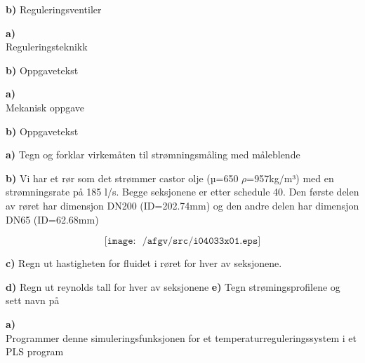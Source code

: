 \textbf{b)}
Reguleringsventiler
\vskip 1cm 

\vfil \eject
\oppgave{}%
\textbf{a)}\\
Reguleringsteknikk
\vskip 1cm 


\textbf{b)}
Oppgavetekst
\vskip 1cm 
\vfil \eject
\oppgave{}%
\textbf{a)}\\
Mekanisk oppgave
\vskip 1cm 


\textbf{b)}
Oppgavetekst
\vskip 1cm 


\vfil \eject
\oppgave{}%
\textbf{a)}
Tegn og forklar virkemåten til strømningsmåling med måleblende
\vskip 1cm

\textbf{b)}
Vi har et rør som det strømmer castor olje (µ=650 $\rho$=957kg/m³) med en strømningsrate på 185 l/s. Begge seksjonene er etter schedule 40.  Den første delen av røret har dimensjon DN200 (ID=202.74mm) og den andre delen har dimensjon DN65 (ID=62.68mm)

$$\texttt{[image: ~/afgv/src/i04033x01.eps]}$$

\textbf{c)}
Regn ut hastigheten for fluidet i røret for hver av seksjonene. 

\vskip 1cm 

\textbf{d)}
Regn ut reynolds tall for hver av seksjonene
\vskip 1cm 
\textbf{e)}
Tegn strømingsprofilene og sett navn på
\vskip 1cm 

\vfil \eject
\oppgave{}%
\textbf{a)}\\
Programmer denne simuleringsfunksjonen for et temperaturreguleringssystem i et PLS program
\vskip 1cm 


